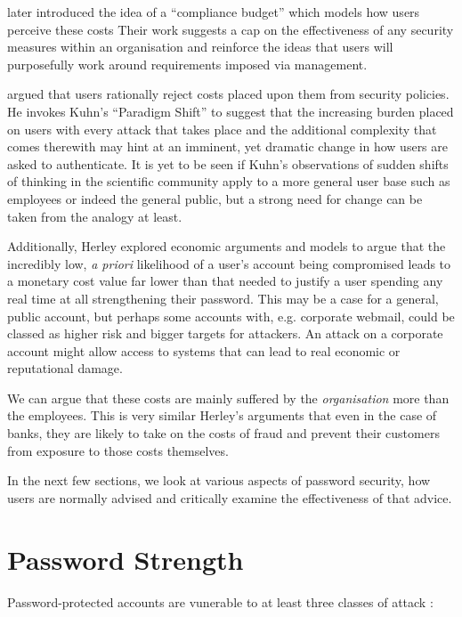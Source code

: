 \documentclass{report}
\begin{document}
\textcite{beautement2009compliance} later introduced the idea of a
``compliance budget'' which models how users perceive these costs
Their work suggests a cap on the effectiveness of any
security measures within an organisation and reinforce the ideas
that users will purposefully work around requirements imposed via
management.

\textcite{herley2009so} argued that users rationally reject costs
placed upon them from security policies. He invokes Kuhn's
``Paradigm Shift''\parencite{kuhn1962structure} to suggest
that the increasing burden placed on users with every attack
that takes place and the additional complexity that comes
therewith may hint at an imminent, yet dramatic change in
how users are asked to authenticate. It is yet to be seen
if Kuhn's observations of sudden shifts of thinking
in the scientific community apply to a more general
user base such as employees or indeed the general public, but
a strong need for change can be taken from the analogy
at least.

Additionally, Herley explored economic arguments
and models
to argue that the incredibly low, \emph{a priori} likelihood
of a user's account being compromised leads to a monetary
cost value far lower than that needed to justify a user
spending any real time at all strengthening their password.
This may be a case for a general, public account, but perhaps
some accounts with, e.g. corporate webmail, could be classed
as higher risk and bigger targets for attackers. An attack
on a corporate account might allow access to systems that
can lead to real economic or reputational damage.

We can argue that these costs
are mainly suffered by the \emph{organisation}
more than the employees. This is very similar Herley's
arguments that even in the case of banks, they are likely
to take on the costs of fraud and prevent their customers
from exposure to those costs themselves.

In the next few sections, we look at various aspects
of password security, how users are normally advised
and critically examine the effectiveness of that advice.

\section{Password Strength}
\label{sec:strength}

Password-protected accounts are vunerable to at least three
classes of attack \parencite{florencio2014password}:
\end{document}
